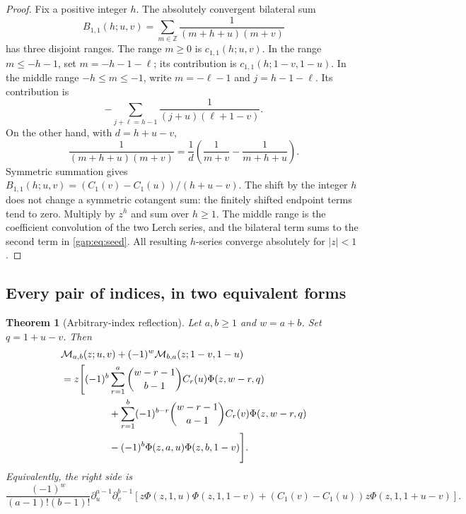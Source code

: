 \documentclass[11pt,letterpaper]{article}
\numberwithin{equation}{section}
\theoremstyle{plain}
\newtheorem{theorem}{Theorem}[section]
\theoremstyle{definition}
\theoremstyle{remark}
\begin{document}
\begin{proof}
Fix a positive integer $h$. The absolutely convergent bilateral sum
\[
 B_{1,1}(h;u,v)=\sum_{m\in\mathbb Z}
       \frac1{(m+h+u)(m+v)}
\]
has three disjoint ranges. The range $m\geq0$ is $c_{1,1}(h;u,v)$.
In the range $m\leq-h-1$, set $m=-h-1-\ell$; its contribution is
$c_{1,1}(h;1-v,1-u)$. In the middle range $-h\leq m\leq-1$, write
$m=-\ell-1$ and $j=h-1-\ell$. Its contribution is
\[
 -\sum_{j+\ell=h-1}\frac1{(j+u)(\ell+1-v)}.
\]
On the other hand, with $d=h+u-v$,
\[
 \frac1{(m+h+u)(m+v)}
 =\frac1d\left(\frac1{m+v}-\frac1{m+h+u}\right).
\]
Symmetric summation gives
$B_{1,1}(h;u,v)=(C_1(v)-C_1(u))/(h+u-v)$.
The shift by the integer $h$ does not change a symmetric cotangent
sum: the finitely shifted endpoint terms tend to zero. Multiply by
$z^h$ and sum over $h\geq1$. The middle range is the coefficient
convolution of the two Lerch series, and the bilateral term sums to
the second term in \eqref{gap:eq:seed}. All resulting $h$-series
converge absolutely for $|z|<1$.
\end{proof}

\subsection{Every pair of indices, in two equivalent forms}

\begin{theorem}[Arbitrary-index reflection]\label{gap:thm:all}
Let $a,b\geq1$ and $w=a+b$. Set $q=1+u-v$. Then
\begin{align}
 &\mathcal M_{a,b}(z;u,v)
      +(-1)^w\mathcal M_{b,a}(z;1-v,1-u)\notag\\
 &=z\Bigg[
 (-1)^b\sum_{r=1}^{a}\binom{w-r-1}{b-1}
       C_r(u)\Phi(z,w-r,q)\notag\\
 &\hspace{17mm}
 +\sum_{r=1}^{b}(-1)^{b-r}\binom{w-r-1}{a-1}
       C_r(v)\Phi(z,w-r,q)\notag\\
 &\hspace{17mm}
 -(-1)^b\Phi(z,a,u)\Phi(z,b,1-v)\Bigg].
 \label{gap:eq:all}
\end{align}
Equivalently, the right side is
\begin{equation}\label{gap:eq:all-derivative}
 \frac{(-1)^w}{(a-1)!(b-1)!}
 \partial_u^{a-1}\partial_v^{b-1}
 \left[
 z\Phi(z,1,u)\Phi(z,1,1-v)
 +(C_1(v)-C_1(u))z\Phi(z,1,1+u-v)
 \right].
\end{equation}
\end{theorem}
\end{document}
